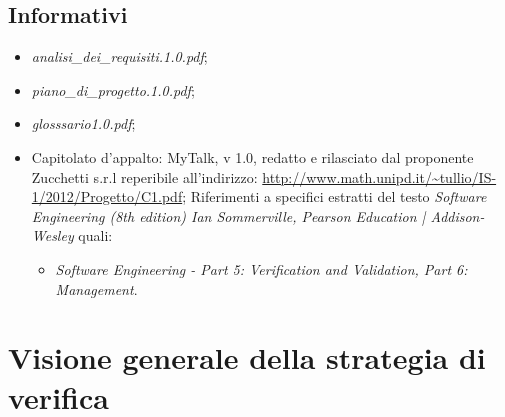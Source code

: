 \subsection{Informativi}
\begin{itemize}
\item[] \textit{analisi\_dei\_requisiti.1.0.pdf};
\item[] \textit{piano\_di\_progetto.1.0.pdf};
\item[] \textit{glosssario1.0.pdf};
\item[] Capitolato d'appalto: MyTalk, v 1.0, redatto e rilasciato dal proponente Zucchetti s.r.l reperibile all'indirizzo: \url{http://www.math.unipd.it/~tullio/IS-1/2012/Progetto/C1.pdf};
Riferimenti a specifici estratti del testo \textit{Software Engineering (8th edition) Ian Sommerville, Pearson Education | Addison-Wesley} quali:
\begin{itemize}
\item[]  \textit{Software Engineering - Part 5: Verification and Validation, Part 6: Management}.\\
\end{itemize}
\end{itemize}
\clearpage
\section{Visione generale della strategia di verifica}
